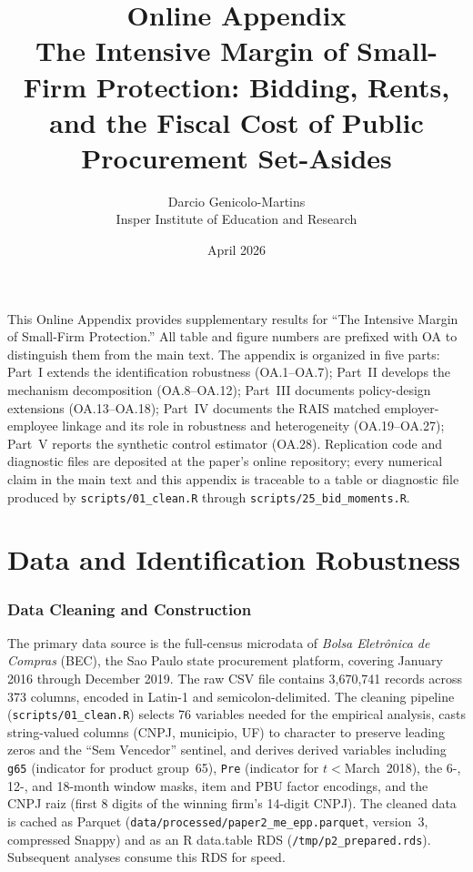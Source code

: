 \documentclass[12pt]{article}
\title{\textbf{Online Appendix}\\[6pt]
\large The Intensive Margin of Small-Firm Protection: Bidding, Rents, and the Fiscal Cost of Public Procurement Set-Asides}
\author{Darcio Genicolo-Martins\\Insper Institute of Education and Research}
\date{April 2026}
\begin{document}
\maketitle

\tableofcontents
\clearpage

\noindent This Online Appendix provides supplementary results for ``The Intensive Margin of Small-Firm Protection.'' All table and figure numbers are prefixed with OA to distinguish them from the main text. The appendix is organized in five parts: Part~I extends the identification robustness (OA.1--OA.7); Part~II develops the mechanism decomposition (OA.8--OA.12); Part~III documents policy-design extensions (OA.13--OA.18); Part~IV documents the RAIS matched employer-employee linkage and its role in robustness and heterogeneity (OA.19--OA.27); Part~V reports the synthetic control estimator (OA.28). Replication code and diagnostic files are deposited at the paper's online repository; every numerical claim in the main text and this appendix is traceable to a table or diagnostic file produced by \texttt{scripts/01\_clean.R} through \texttt{scripts/25\_bid\_moments.R}.

\clearpage

\part{Data and Identification Robustness}

\section{Data Cleaning and Construction}

The primary data source is the full-census microdata of \emph{Bolsa Eletr\^onica de Compras} (BEC), the Sao Paulo state procurement platform, covering January 2016 through December 2019. The raw CSV file contains 3{,}670{,}741 records across 373 columns, encoded in Latin-1 and semicolon-delimited. The cleaning pipeline (\texttt{scripts/01\_clean.R}) selects 76 variables needed for the empirical analysis, casts string-valued columns (CNPJ, municipio, UF) to character to preserve leading zeros and the ``Sem Vencedor'' sentinel, and derives derived variables including \texttt{g65} (indicator for product group~65), \texttt{Pre} (indicator for $t<$March~2018), the 6-, 12-, and 18-month window masks, item and PBU factor encodings, and the CNPJ raiz (first 8 digits of the winning firm's 14-digit CNPJ). The cleaned data is cached as Parquet (\texttt{data/processed/paper2\_me\_epp.parquet}, version~3, compressed Snappy) and as an R data.table RDS (\texttt{/tmp/p2\_prepared.rds}). Subsequent analyses consume this RDS for speed.
\end{document}
